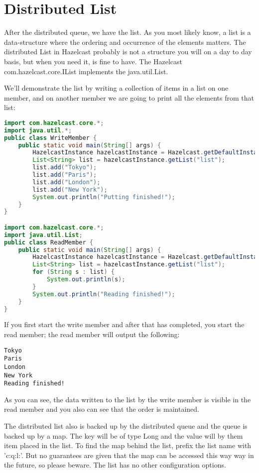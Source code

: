 \section{Distributed List}
After the distributed queue, we have the list. As you most likely know, a list is a data-structure where the ordering and occurrence of the elements matters. The distributed List in Hazelcast probably is not a structure you will on a day to day basis, but when you need it, is fine to have. The Hazelcast com.hazelcast.core.IList implements the java.util.List.

We'll demonstrate the list by writing a collection of items in a list on one member, and on another member we are going to print all the elements from that list:
\begin{lstlisting}[language=java]
import com.hazelcast.core.*;
import java.util.*;
public class WriteMember {
    public static void main(String[] args) {
        HazelcastInstance hazelcastInstance = Hazelcast.getDefaultInstance();
        List<String> list = hazelcastInstance.getList("list");
        list.add("Tokyo");
        list.add("Paris");
        list.add("London");
        list.add("New York");
        System.out.println("Putting finished!");
    }
}

import com.hazelcast.core.*;
import java.util.List;
public class ReadMember {
    public static void main(String[] args) {
        HazelcastInstance hazelcastInstance = Hazelcast.getDefaultInstance();
        List<String> list = hazelcastInstance.getList("list");
        for (String s : list) {
            System.out.println(s);
        }
        System.out.println("Reading finished!");
    }
}
\end{lstlisting}
If you first start the write member and after that has completed, you start the read member; the read member will output the following:
\begin{verbatim}
Tokyo
Paris
London
New York
Reading finished!
\end{verbatim}
As you can see, the data written to the list by the write member is visible in the read member and you also can see that the order is maintained.

The distributed list also is backed up by the distributed queue and the queue is backed up by a map. The key will be of type Long and the value will by them item placed in the list. To find the map behind the list, prefix the list name with 'c:q:l:'. But no guarantees are given that the map can be accessed this way way in the future, so please beware. The list has no other configuration options.

